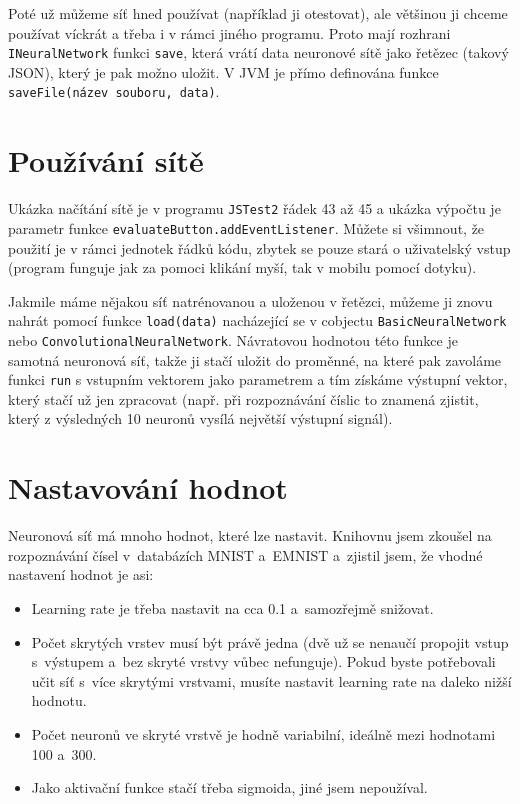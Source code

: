 \documentclass[12pt]{report}			%
\begin{document}
				Poté už můžeme síť hned používat (například ji otestovat), ale většinou ji chceme používat víckrát a třeba i v rámci jiného programu. Proto mají  \gls{rozhrani} \verb!INeuralNetwork! funkci \verb!save!, která vrátí data neuronové sítě jako řetězec (takový  \gls{JSON}), který je pak možno uložit. V \gls{JVM} je přímo definována funkce \verb!saveFile(název souboru, data)!.
				
			\section{Používání sítě}
				Ukázka načítání sítě je v programu \verb!JSTest2! řádek 43 až 45 a ukázka výpočtu je parametr funkce \verb!evaluateButton.addEventListener!. Můžete si všimnout, že použití je v rámci jednotek řádků kódu, zbytek se pouze stará o uživatelský vstup (program funguje jak za pomoci klikání myší, tak v mobilu pomocí dotyku).
				
				Jakmile máme nějakou síť natrénovanou a uloženou v řetězci, můžeme ji znovu nahrát pomocí funkce \verb!load(data)! nacházející se v \gls{cobject}u  \verb!BasicNeuralNetwork! nebo \verb!ConvolutionalNeuralNetwork!. Návratovou hodnotou této funkce je samotná neuronová síť, takže ji stačí uložit do proměnné, na které pak zavoláme funkci \verb!run! s vstupním vektorem jako parametrem a tím získáme výstupní vektor, který stačí už jen zpracovat (např. při rozpoznávání číslic to znamená zjistit, který z výsledných 10 neuronů vysílá největší výstupní signál).
				
		
			\section{Nastavování hodnot}
				Neuronová síť má mnoho hodnot, které lze nastavit. Knihovnu jsem zkoušel na rozpoznávání čísel v~databázích MNIST a~EMNIST a~zjistil jsem, že vhodné nastavení hodnot je asi:
				\begin{itemize}
					\item Learning rate je třeba nastavit na cca 0.1 a~samozřejmě snižovat.
					\item Počet skrytých vrstev musí být právě jedna (dvě už se nenaučí propojit vstup s~výstupem a~bez skryté vrstvy vůbec nefunguje). Pokud byste potřebovali učit síť s~více skrytými vrstvami, musíte nastavit learning rate na daleko nižší hodnotu.
					\item Počet neuronů ve skryté vrstvě je hodně variabilní, ideálně mezi hodnotami 100 a~300.
					\item Jako aktivační funkce stačí třeba sigmoida, jiné jsem nepoužíval.
				\end{itemize}
\end{document}
